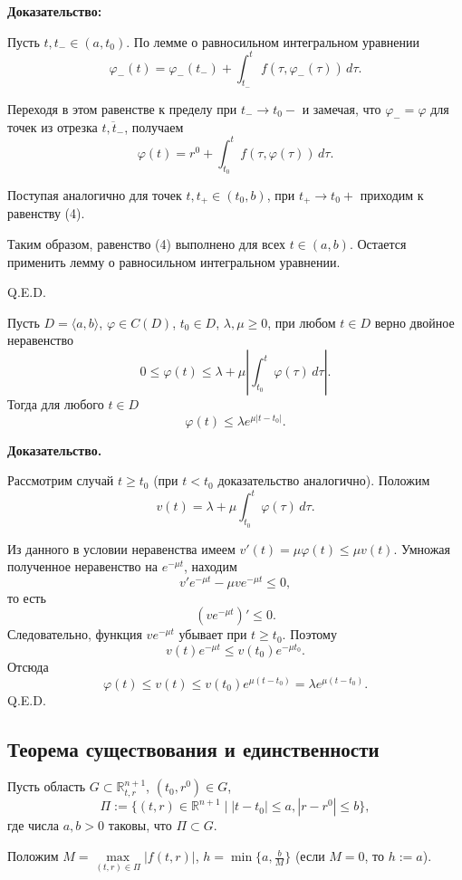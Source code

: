 \textbf{Доказательство:}

Пусть $t, t_- \in (a, t_0)$. По лемме о равносильном интегральном уравнении
$$\varphi_-(t) = \varphi_-(t_-) + \int_{t_-}^{t} f(\tau, \varphi_-(\tau)) \, d\tau.$$

Переходя в этом равенстве к пределу при $t_- \to t_0-$ и замечая, что $\varphi_- = \varphi$ для точек из отрезка $\overline{t, t_-}$, получаем
$$\varphi(t) = r^0 + \int_{t_0}^{t} f(\tau, \varphi(\tau)) \, d\tau.$$

Поступая аналогично для точек $t, t_+ \in (t_0, b)$, при $t_+ \to t_0+$ приходим к равенству (4).

Таким образом, равенство (4) выполнено для всех $t \in (a, b)$. Остается применить лемму о равносильном интегральном уравнении.

\hfill Q.E.D.


Пусть $D = \langle a, b \rangle$, $\varphi \in C(D)$, $t_0 \in D$, $\lambda, \mu \geq 0$, при любом $t \in D$ верно двойное неравенство
$$0 \leq \varphi(t) \leq \lambda + \mu \left| \int_{t_0}^{t} \varphi(\tau) \, d\tau \right|.$$
Тогда для любого $t \in D$
$$\varphi(t) \leq \lambda e^{\mu|t - t_0|}.$$

\textbf{Доказательство.} 

Рассмотрим случай $t \geq t_0$ (при $t < t_0$ доказательство аналогично). Положим
$$v(t) = \lambda + \mu \int_{t_0}^{t} \varphi(\tau) \, d\tau.$$

Из данного в условии неравенства имеем $v'(t) = \mu \varphi(t) \leq \mu v(t)$. Умножая полученное неравенство на $e^{-\mu t}$, находим
$$v' e^{-\mu t} - \mu v e^{-\mu t} \leq 0,$$
то есть
$$(v e^{-\mu t})' \leq 0.$$
Следовательно, функция $v e^{-\mu t}$ убывает при $t \geq t_0$. Поэтому
$$v(t) e^{-\mu t} \leq v(t_0) e^{-\mu t_0}.$$
Отсюда
$$\varphi(t) \leq v(t) \leq v(t_0) e^{\mu (t - t_0)} = \lambda e^{\mu (t - t_0)}.$$
\hfill Q.E.D.


\subsection{Теорема существования и единственности}

 Пусть область $G \subset \mathbb{R}_{t,r}^{n+1}$, $(t_0, r^0) \in G$,
$$\Pi := \{(t, r) \in \mathbb{R}^{n+1} \mid |t - t_0| \leq a, |r - r^0| \leq b\},$$
где числа $a, b > 0$ таковы, что $\Pi \subset G$. 

Положим $M = \max\limits_{{(t,r)} \in \Pi} |f(t, r)|$, $h = \min\{a, \frac{b}{M}\}$ (если $M = 0$, то $h := a$). 

